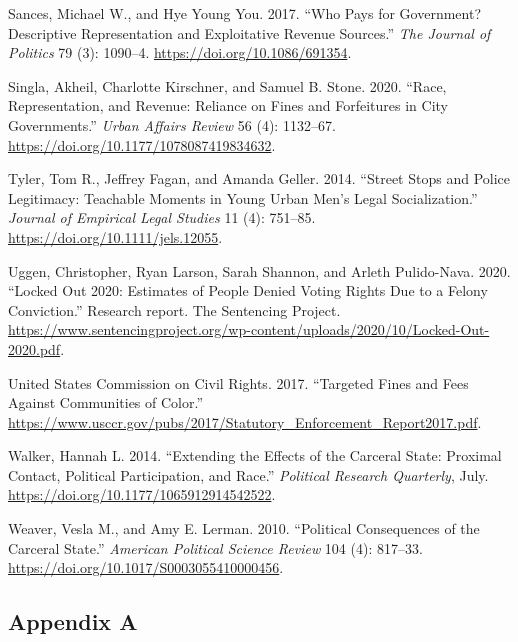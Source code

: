 \documentclass[
  12pt,
]{article}
\newlength{\cslhangindent}
\newenvironment{cslreferences}%
  {\setlength{\parindent}{0pt}%
  \everypar{\setlength{\hangindent}{\cslhangindent}}\ignorespaces}%
  {\par}
\begin{document}
\begin{cslreferences}
\leavevmode\hypertarget{ref-Sances2017}{}%
Sances, Michael W., and Hye Young You. 2017. ``Who Pays for Government? Descriptive Representation and Exploitative Revenue Sources.'' \emph{The Journal of Politics} 79 (3): 1090--4. \url{https://doi.org/10.1086/691354}.

\leavevmode\hypertarget{ref-Singla2020}{}%
Singla, Akheil, Charlotte Kirschner, and Samuel B. Stone. 2020. ``Race, Representation, and Revenue: Reliance on Fines and Forfeitures in City Governments.'' \emph{Urban Affairs Review} 56 (4): 1132--67. \url{https://doi.org/10.1177/1078087419834632}.

\leavevmode\hypertarget{ref-Tyler2014}{}%
Tyler, Tom R., Jeffrey Fagan, and Amanda Geller. 2014. ``Street Stops and Police Legitimacy: Teachable Moments in Young Urban Men's Legal Socialization.'' \emph{Journal of Empirical Legal Studies} 11 (4): 751--85. \url{https://doi.org/10.1111/jels.12055}.

\leavevmode\hypertarget{ref-Uggen2020}{}%
Uggen, Christopher, Ryan Larson, Sarah Shannon, and Arleth Pulido-Nava. 2020. ``Locked Out 2020: Estimates of People Denied Voting Rights Due to a Felony Conviction.'' Research report. The Sentencing Project. \url{https://www.sentencingproject.org/wp-content/uploads/2020/10/Locked-Out-2020.pdf}.

\leavevmode\hypertarget{ref-UnitedStatesCommissiononCivilRights2017}{}%
United States Commission on Civil Rights. 2017. ``Targeted Fines and Fees Against Communities of Color.'' \url{https://www.usccr.gov/pubs/2017/Statutory_Enforcement_Report2017.pdf}.

\leavevmode\hypertarget{ref-Walker2014}{}%
Walker, Hannah L. 2014. ``Extending the Effects of the Carceral State: Proximal Contact, Political Participation, and Race.'' \emph{Political Research Quarterly}, July. \url{https://doi.org/10.1177/1065912914542522}.

\leavevmode\hypertarget{ref-Weaver2010}{}%
Weaver, Vesla M., and Amy E. Lerman. 2010. ``Political Consequences of the Carceral State.'' \emph{American Political Science Review} 104 (4): 817--33. \url{https://doi.org/10.1017/S0003055410000456}.
\end{cslreferences}

\newpage
{}

\hypertarget{appendix-a}{%
\subsection*{Appendix A}\label{appendix-a}}
\end{document}
